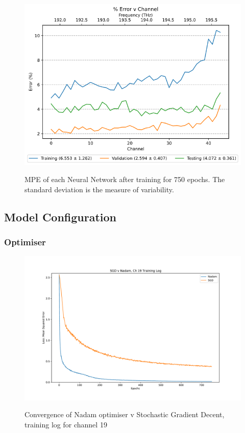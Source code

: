 
\begin{figure}
    \centering
    \caption{MPE of each Neural Network after training for 750 epochs. The standard deviation is the measure of variability.}
    \includegraphics[width=\textwidth]{project/img/ml_model/discrete/percent_error.png}
    \label{fig:ml_model:disc_train_val}
\end{figure}

\FloatBarrier
\subsection{Model Configuration}

\FloatBarrier
\subsubsection{Optimiser} \label{subsec:optimiser}

\begin{figure}[h]
    \centering
    \caption{Convergence of Nadam optimiser v Stochastic Gradient Decent, training log for channel 19}
    \includegraphics[width=\textwidth]{project/img/ml_model/discrete/SGD v Nadam, Ch 19 Training Log.pdf}
    \label{fig:ml_model:sgd_nadam}
\end{figure}

